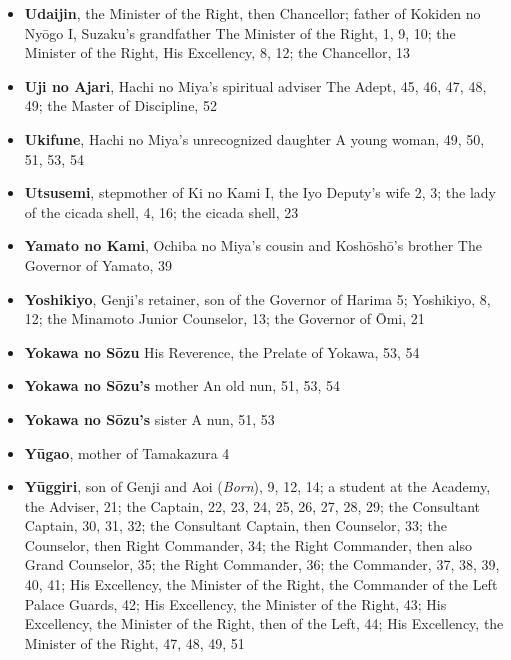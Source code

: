 \documentclass{article}
\begin{document}
\begin{multicols}{2}
\begin{itemize}[
			label=,
			leftmargin=0em,
			rightmargin=-1.5em,
			itemindent=-2em,
			nosep,
		]
		\item \textbf{Udaijin}, the Minister of the Right, then Chancellor; father of Kokiden no Nyōgo I, Suzaku's grandfather The Minister of the Right, 1, 9, 10;
		      the Minister of the Right, His Excellency, 8, 12;
		      the Chancellor, 13

		\item \textbf{Uji no Ajari}, Hachi no Miya's spiritual adviser The Adept, 45, 46, 47, 48, 49;
		      the Master of Discipline, 52

		\item \textbf{Ukifune}, Hachi no Miya's unrecognized daughter A young woman, 49, 50, 51, 53, 54

		\item \textbf{Utsusemi}, stepmother of Ki no Kami I, the Iyo Deputy's wife 2, 3;
		      the lady of the cicada shell, 4, 16;
		      the cicada shell, 23

		\item \textbf{Yamato no Kami}, Ochiba no Miya's cousin and Koshōshō's brother The Governor of Yamato, 39

		\item \textbf{Yoshikiyo}, Genji's retainer, son of the Governor of Harima 5;
		      Yoshikiyo, 8, 12;
		      the Minamoto Junior Counselor, 13;
		      the Governor of Ōmi, 21

		\item \textbf{Yokawa no Sōzu} His Reverence, the Prelate of Yokawa, 53, 54

		\item \textbf{Yokawa no Sōzu's} mother An old nun, 51, 53, 54

		\item \textbf{Yokawa no Sōzu's} sister A nun, 51, 53

		\item \textbf{Yūgao}, mother of Tamakazura 4

		\item \textbf{Yūggiri}, son of Genji and Aoi (\textit{Born}), 9, 12, 14;
		      a student at the Academy, the Adviser, 21;
		      the Captain, 22, 23, 24, 25, 26, 27, 28, 29;
		      the Consultant Captain, 30, 31, 32;
		      the Consultant Captain, then Counselor, 33;
		      the Counselor, then Right Commander, 34;
		      the Right Commander, then also Grand Counselor, 35;
		      the Right Commander, 36;
		      the Commander, 37, 38, 39, 40, 41;
		      His Excellency, the Minister of the Right, the Commander of the Left Palace Guards, 42;
		      His Excellency, the Minister of the Right, 43;
		      His Excellency, the Minister of the Right, then of the Left, 44;
		      His Excellency, the Minister of the Right, 47, 48, 49, 51

	\end{itemize}



\end{multicols}
\end{document}
